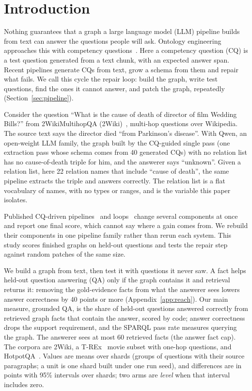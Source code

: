 \section{Introduction}
\label{sec:intro}

Nothing guarantees that a graph a large language model (LLM) pipeline builds from text can answer the questions people will ask. Ontology engineering approaches this with competency questions~\cite{gruninger1995methodology,noy2001ontology101}. Here a competency question (CQ) is a test question generated from a text chunk, with an expected answer span. Recent pipelines generate CQs from text, grow a schema from them and repair what fails. We call this cycle the repair loop: build the graph, write test questions, find the ones it cannot answer, and patch the graph, repeatedly (Section~\ref{sec:pipeline}).

Consider the question ``What is the cause of death of director of film Wedding Bills?'' from 2WikiMultihopQA (2Wiki)~\cite{ho2020twowiki}, multi-hop questions over Wikipedia. The source text says the director died ``from Parkinson's disease''. With Qwen, an open-weight LLM family, the graph built by the CQ-guided single pass (one extraction pass whose schema comes from 40 generated CQs) with no relation list has no cause-of-death triple for him, and the answerer says ``unknown''. Given a relation list, here 22 relation names that include ``cause of death'', the same pipeline extracts the triple and answers correctly. The relation list is a flat vocabulary of names, with no types or ranges, and is the variable this paper isolates.

Published CQ-driven pipelines~\cite{feng2024ontologygrounded,kaiser2025hydra,choi2026socratickg} and loops~\cite{huang2025tcrqf,chong2026evoontology,zhang2026oak} change several components at once and report one final score, which cannot say where a gain comes from. We rebuild their components in one pipeline family rather than rerun each system. This study scores finished graphs on held-out questions and tests the repair step against random patches of the same size.

We build a graph from text, then test it with questions it never saw. A fact helps held-out question answering (QA) only if the graph contains it and retrieval returns it: removing the gold-evidence facts from what the answerer sees lowers answer correctness by 40 points or more (Appendix~\ref{app:reach}). Our main measure, grounded QA, is the share of held-out questions answered correctly from retrieved graph facts that contain the answer, scored by code; answer correctness drops the support requirement, and the SPARQL pass rate measures querying the graph. The answerer sees at most 60 retrieved facts (the answer fact cap). The corpora are 2Wiki, a T-REx~\cite{elsahar2018trex} movie subset with one-hop questions, and HotpotQA~\cite{yang2018hotpotqa}. Values are means over shards (groups of questions with their source paragraphs; a unit is one shard built under one run seed), and differences are in points with 95\% intervals over shards; two arms are \emph{level} when that interval includes zero.

